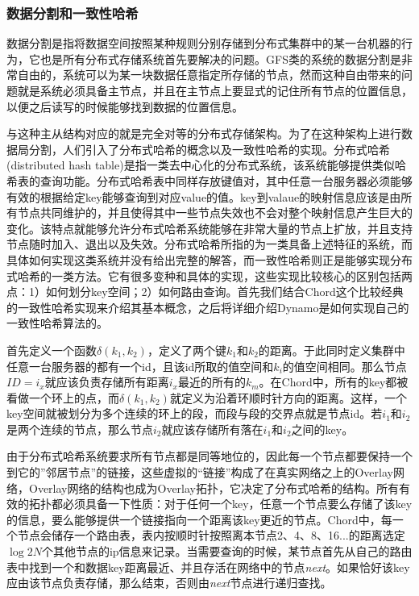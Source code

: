 \subsubsection{数据分割和一致性哈希}
数据分割是指将数据空间按照某种规则分别存储到分布式集群中的某一台机器的行为，它也是所有分布式存储系统首先要解决的问题。GFS类的系统的数据分割是非常自由的，系统可以为某一块数据任意指定所存储的节点，然而这种自由带来的问题就是系统必须具备主节点，并且在主节点上要显式的记住所有节点的位置信息，以便之后读写的时候能够找到数据的位置信息。

与这种主从结构对应的就是完全对等的分布式存储架构。为了在这种架构上进行数据局分割，人们引入了分布式哈希的概念以及一致性哈希的实现。分布式哈希(distributed hash table)是指一类去中心化的分布式系统，该系统能够提供类似哈希表的查询功能。分布式哈希表中同样存放键值对，其中任意一台服务器必须能够有效的根据给定key能够查询到对应value的值。key到valaue的映射信息应该是由所有节点共同维护的，并且使得其中一些节点失效也不会对整个映射信息产生巨大的变化。该特点就能够允许分布式哈希系统能够在非常大量的节点上扩放，并且支持节点随时加入、退出以及失效。分布式哈希所指的为一类具备上述特征的系统，而具体如何实现这类系统并没有给出完整的解答，而一致性哈希则正是能够实现分布式哈希的一类方法。它有很多变种和具体的实现，这些实现比较核心的区别包括两点：1）如何划分key空间；2）如何路由查询。首先我们结合Chord这个比较经典的一致性哈希实现来介绍其基本概念，之后将详细介绍Dynamo是如何实现自己的一致性哈希算法的。

首先定义一个函数$\delta(k_1, k_2)$，定义了两个键$k_1$和$k_2$的距离。于此同时定义集群中任意一台服务器的都有一个id，且该id所取的值空间和$k_i$的值空间相同。那么节点$ID=i_x$就应该负责存储所有距离$i_x$最近的所有的$k_m$。在Chord中，所有的key都被看做一个环上的点，而$\delta(k_1, k_2)$就定义为沿着环顺时针方向的距离。这样，一个key空间就被划分为多个连续的环上的段，而段与段的交界点就是节点id。若$i_1$和$i_2$是两个连续的节点，那么节点$i_2$就应该存储所有落在$i_1$和$i_2$之间的key。

由于分布式哈希系统要求所有节点都是同等地位的，因此每一个节点都要保持一个到它的”邻居节点”的链接，这些虚拟的“链接”构成了在真实网络之上的Overlay网络，Overlay网络的结构也成为Overlay拓扑，它决定了分布式哈希的结构。所有有效的拓扑都必须具备一下性质：对于任何一个key，任意一个节点要么存储了该key的信息，要么能够提供一个链接指向一个距离该key更近的节点。Chord中，每一个节点会储存一个路由表，表内按顺时针按照离本节点2、4、8、16...的距离选定$\log2N$个其他节点的ip信息来记录。当需要查询的时候，某节点首先从自己的路由表中找到一个和数据key距离最近、并且存活在网络中的节点\textit{next}。如果恰好该key应由该节点负责存储，那么结束，否则由\textit{next}节点进行递归查找。

